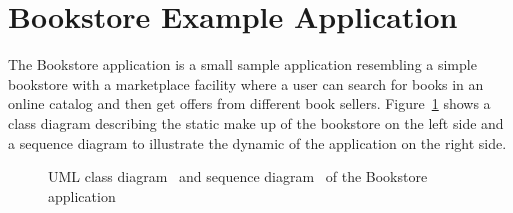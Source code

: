 \section{Bookstore Example Application}\label{sec:example:bookstore}

The Bookstore application is a small sample application resembling a simple bookstore with a marketplace facility where a user can search for books in an online catalog and then get offers from different book sellers. Figure~\ref{fig:bookstore:classAndSequenceDiagrams} shows a class diagram describing the static make up of the bookstore on the left side and a sequence diagram to illustrate the dynamic of the application on the right side. 

\begin{figure}[h]\centering
{}%
\caption{UML class diagram~ and %
sequence diagram~ of the Bookstore application}
\label{fig:bookstore:classAndSequenceDiagrams}
\end{figure}

